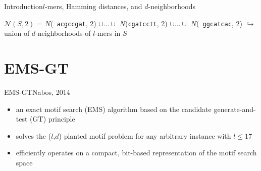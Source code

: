 \documentclass[pdf,xcolor={dvipsnames}]{beamer}
\begin{document}
\begin{frame}{Introduction}{$l$-mers, Hamming distances, and $d$-neighborhoods}
\begin{itemize}
{{			%
				$\mathcal{N}(S, 2)$ = 
					$N$(\texttt{\color{green}  acgccgat}, 2) $\cup ...\cup$
					$N$(\texttt{\color{red}cgatcctt}, 2) $\cup ...\cup$
					$N$(\texttt{\color{blue} ggcatcac}, 2)\newline
				\hspace*{0.05\textwidth} {\color{blue} $\hookrightarrow$ union of $d$-neighborhoods of $l$-mers in $S$}
			}
		}
		\end{itemize}
		\end{frame}

\section{EMS-GT}
	\begin{frame}{EMS-GT}{Nabos, 2014}
		\begin{itemize}
		\item an exact motif search (EMS) algorithm based on the candidate generate-and-test (GT) principle\newline
		\item solves the ($l$,$d$) planted motif problem for any arbitrary instance with $l \leq 17$ \newline
		\item efficiently operates on a compact, bit-based representation of the motif search space
		\end{itemize}
		\end{frame}
\end{document}
